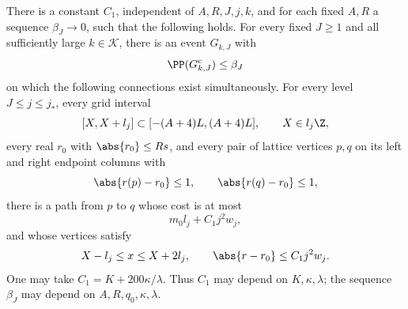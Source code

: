 \begin{lemma}\label{df:gr:grid-tools}
There is a constant $C_1$, independent of $A,R,J,j,k$, and for each
fixed $A,R$ a sequence $\beta_J\to0$, such that the following holds.
For every fixed $J\ge1$ and all sufficiently large $k\in\mathcal K$,
there is an event $G_{k,J}$ with
\[
 \PP(G_{k,J}^{\mathrm c})\le\beta_J
\]
on which the following connections exist simultaneously. For every
level $J\le j\le j_*$, every grid interval
\[
 [X,X+l_j]\subset[-(A+4)L,(A+4)L],\qquad X\in l_j\Z,
\]
every real $r_0$ with $\abs{r_0}\le Rs$, and every pair of lattice
vertices $p,q$ on its left and right endpoint columns with
\[
 \abs{r(p)-r_0}\le1,\qquad\abs{r(q)-r_0}\le1,
\]
there is a path from $p$ to $q$ whose cost is at most
\begin{equation}\label{df:eq:gr-grid-cost}
 m_0l_j+C_1j^2w_j,
\end{equation}
and whose vertices satisfy
\begin{equation}\label{df:eq:gr-grid-localization}
 X-l_j\le x\le X+2l_j,\qquad
 \abs{r-r_0}\le C_1j^2w_j.
\end{equation}
One may take $C_1=K+200\kappa/\lambda$. Thus $C_1$ may depend on
$K,\kappa,\lambda$; the sequence $\beta_J$ may depend on
$A,R,q_0,\kappa,\lambda$.
\end{lemma}
